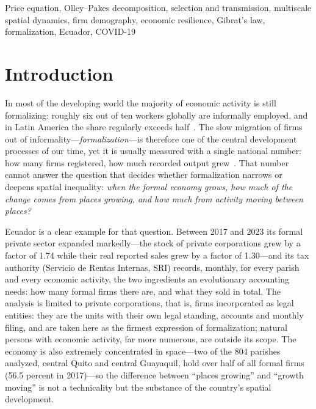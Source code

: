 \documentclass[conference]{IEEEtran}
\begin{document}
\begin{IEEEkeywords}
Price equation, Olley--Pakes decomposition, selection and transmission,
multiscale spatial dynamics, firm demography, economic resilience,
Gibrat's law, formalization, Ecuador, COVID-19
\end{IEEEkeywords}

\section{Introduction}

In most of the developing world the majority of economic activity is still formalizing:
roughly six out of ten workers globally are informally employed, and
in Latin America the share regularly exceeds half~\cite{ilo2018}. The slow
migration of firms out of informality---\textit{formalization}---is therefore
one of the central development processes of our time, yet it is usually
measured with a single national number: how many firms registered, how much
recorded output grew~\cite{laporta2014}. That number cannot answer the
question that decides whether formalization narrows or deepens spatial
inequality: \textit{when the formal economy grows, how much of the change
comes from places growing, and how much from activity moving between
places?}

Ecuador is a clear example for that question. Between 2017
and 2023 its formal private sector expanded markedly---the stock of
private corporations grew by a factor of 1.74 while their real reported
sales grew by a factor of 1.30---and its tax authority (Servicio de Rentas
Internas, SRI) records, monthly, for every parish and every economic
activity, the two ingredients an evolutionary accounting needs: how many
formal firms there are, and what they sold in total. The analysis is
limited to private corporations, that is, firms incorporated as legal
entities: they are the units with their own legal standing, accounts and
monthly filing, and are taken here as the firmest expression of
formalization; natural persons with economic activity, far more numerous,
are outside its scope. The economy is also extremely concentrated in
space---two of the 804 parishes analyzed, central Quito and central
Guayaquil, hold over half of all formal firms (56.5 percent in 2017)---so
the difference between ``places growing'' and ``growth moving'' is not a
technicality but the substance of the country's spatial development.
\end{document}
